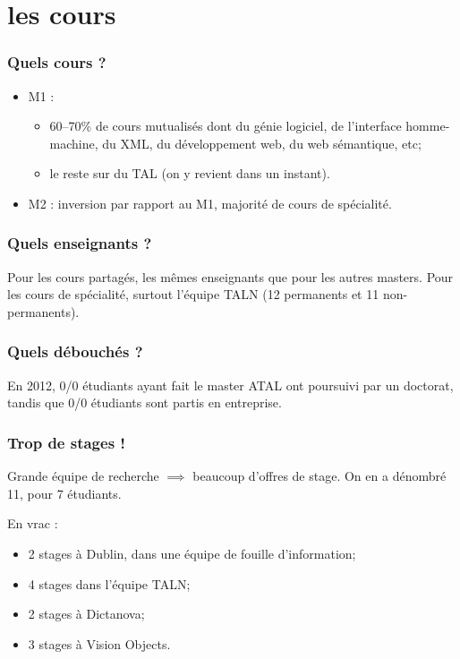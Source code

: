 \documentclass{beamer}
\begin{document}
\section{les cours}

\begin{frame}
  \frametitle{Quels cours ?}
  \begin{itemize}
  \item M1 :
    \begin{itemize}
    \item 60--70\% de cours mutualisés dont du génie logiciel, de
      l'interface homme-machine, du XML, du développement web, du web
      sémantique, etc;
    \item le reste sur du TAL (on y revient dans un instant).
    \end{itemize}
  \item M2 : inversion par rapport au M1, majorité de cours de
    spécialité.
  \end{itemize}
\end{frame}

\begin{frame}
  \frametitle{Quels enseignants ?}
  Pour les cours partagés, les mêmes enseignants que pour les autres
  masters. Pour les cours de spécialité, surtout l'équipe TALN (12
  permanents et 11 non-permanents).
\end{frame}

\begin{frame}
  \frametitle{Quels débouchés ?}
  En 2012, 0/0 étudiants ayant fait le master ATAL ont poursuivi par
  un doctorat, tandis que 0/0 étudiants sont partis en entreprise.
\end{frame}

\begin{frame}
  \frametitle{Trop de stages !}
  Grande équipe de recherche $\implies$ beaucoup d'offres de stage.
  On en a dénombré 11, pour 7 étudiants.

  En vrac :
  \begin{itemize}
  \item 2 stages à Dublin, dans une équipe de fouille d'information;
  \item 4 stages dans l'équipe TALN;
  \item 2 stages à Dictanova;
  \item 3 stages à Vision Objects.
  \end{itemize}
\end{frame}
\end{document}
